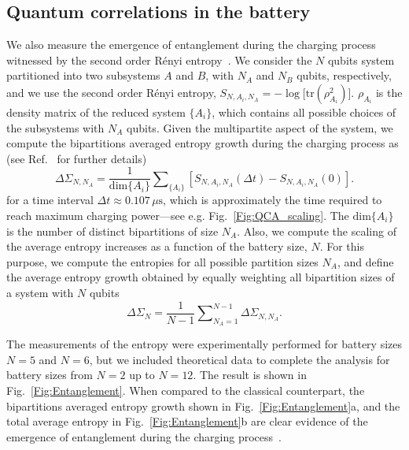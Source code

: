 \documentclass[aps,prl,epsfigure,twocolumn,superscriptaddress]{revtex4-2}
\newcommand{\1}{\mathbbm{1}}
\newcommand{\SubFig}[2]{\ref{#1}{\color{blue}#2}}
\begin{document}
\subsection{Quantum correlations in the battery}

We also measure the emergence of entanglement during the charging process witnessed by the second order Rényi entropy~\cite{Horodecki:96PLA,Horodecki:96,Horodecki:09}. We consider the $N$ qubits system partitioned into two subsystems $A$ and $B$, with $N_A$ and $N_B$ qubits, respectively, and we use the second order Rényi entropy, $S_{N,A_i,N_A} = - \log \big[\mathrm{tr}(\rho_{A_i}^2)\big]$. $\rho_{A_i}$ is the density matrix of the reduced system $\{A_i\}$, which contains all possible choices of the subsystems with $N_A$ qubits. Given the multipartite aspect of the system, we compute the bipartitions averaged entropy growth during the charging process as (see Ref.~\cite{SM} for further details)
\begin{equation}
	\Delta \Sigma_{N,N_A} = \frac{1}{\mathrm{dim}\{A_i\}} \sum\nolimits_{\{A_i\}} \left[S_{N,A_i,N_A}(\Delta t) - S_{N,A_i,N_A}(0)\right] .
\end{equation}
for a time interval $\Delta t \approx 0.107 \, \mu\text{s}$, which is approximately the time required to reach maximum charging power---see e.g. Fig.~\ref{Fig:QCA_scaling}. The $\mathrm{dim}\{A_i\}$ is the number of distinct bipartitions of size $N_A$. Also, we compute the scaling of the average entropy increases as a function of the battery size, $N$. For this purpose, we compute the entropies for all possible partition sizes $N_A$, and define the average entropy growth obtained by equally weighting all bipartition sizes of a system with $N$ qubits
\begin{equation}
	\Delta \Sigma_{N} = \frac{1}{N-1} \sum\nolimits_{N_A = 1}^{N-1} \Delta \Sigma_{N,N_A} .
\end{equation}

The measurements of the entropy were experimentally performed for battery sizes $N=5$ and $N=6$, but we included theoretical data to complete the analysis for battery sizes from $N=2$ up to $N=12$. The result is shown in Fig.~\ref{Fig:Entanglement}. When compared to the classical counterpart, the bipartitions averaged entropy growth shown in Fig.~\SubFig{Fig:Entanglement}{a}, and the total average entropy in Fig.~\SubFig{Fig:Entanglement}{b} are clear evidence of the emergence of entanglement during the charging process~\cite{Horodecki:96PLA,Horodecki:96,Horodecki:09}.
\end{document}
